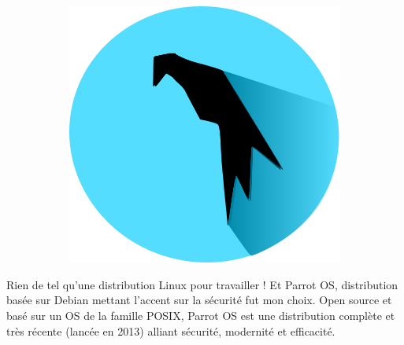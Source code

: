 \documentclass{article}
\begin{document}
\begin{figure}[h!]
	\centering
  	\begin{subfigure}[b]{0.2\linewidth}
    \includegraphics[width=\linewidth]{Parrot.png}
  	\end{subfigure}
\end{figure}

Rien de tel qu'une distribution Linux pour travailler ! Et Parrot OS, distribution basée sur Debian mettant l'accent sur la sécurité fut mon choix. Open source et basé sur un OS de la famille POSIX, Parrot OS est une distribution complète et très récente (lancée en 2013) alliant sécurité, modernité et efficacité.
\newpage
\end{document}

